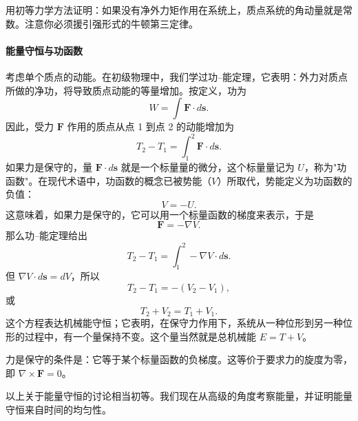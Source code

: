\begin{example}[用初等力学证明角动量守恒]
用初等力学方法证明：如果没有净外力矩作用在系统上，质点系统的角动量就是常数。注意你必须援引强形式的牛顿第三定律。
\end{example}

\paragraph{能量守恒与功函数}
考虑单个质点的动能。在初级物理中，我们学过功--能定理，它表明：外力对质点所做的净功，将导致质点动能的等量增加。按定义，功为
\begin{equation}\label{eq:1.W}
W = \int \mathbf{F}\cdot d\mathbf{s}.
\end{equation}
因此，受力 $\mathbf{F}$ 作用的质点从点 1 到点 2 的动能增加为
\begin{equation}\label{eq:1.W12}
T_2 - T_1 = \int_1^2 \mathbf{F}\cdot d\mathbf{s}.
\end{equation}
如果力是保守的，量 $\mathbf{F}\cdot d\mathbf{s}$ 就是一个标量量的微分，这个标量量记为 $U$，称为"功函数"。在现代术语中，功函数的概念已被势能（$V$）所取代，势能定义为功函数的负值：
\begin{equation}\label{eq:1.VU}
V = -U.
\end{equation}
这意味着，如果力是保守的，它可以用一个标量函数的梯度来表示，于是
\begin{equation}\label{eq:1.Fgrad}
\mathbf{F} = -\nabla V.
\end{equation}
那么功--能定理给出
\begin{equation*}
T_2 - T_1 = \int_1^2 -\nabla V\cdot d\mathbf{s}.
\end{equation*}
但 $\nabla V\cdot d\mathbf{s} = dV$，所以
\begin{equation*}
T_2 - T_1 = -(V_2 - V_1),
\end{equation*}
或
\begin{equation}\label{eq:1.Econs}
T_2 + V_2 = T_1 + V_1.
\end{equation}
这个方程表达机械能守恒；它表明，在保守力作用下，系统从一种位形到另一种位形的过程中，有一个量保持不变。这个量当然就是总机械能 $E = T + V$。

力是保守的条件是：它等于某个标量函数的负梯度。这等价于要求力的旋度为零，即 $\nabla\times\mathbf{F} = 0$。

以上关于能量守恒的讨论相当初等。我们现在从高级的角度考察能量，并证明能量守恒来自时间的均匀性。

